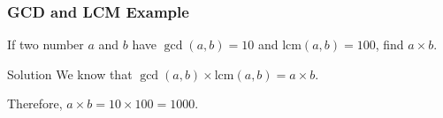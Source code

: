 \documentclass[10pt]{beamer}
\begin{document}
\begin{frame}
    \frametitle{GCD and LCM Example}
    \begin{example}
        If two number $a$ and $b$ have $\gcd(a,b) = 10$ and $\text{lcm}(a,b) = 100$, find $a \times b$.
    \end{example}

    \begin{block}{Solution}
        We know that $\gcd(a,b) \times \text{lcm}(a,b) = a \times b$.

        Therefore, $a \times b = 10 \times 100 = 1000$.
    \end{block}


\end{frame}
\end{document}
